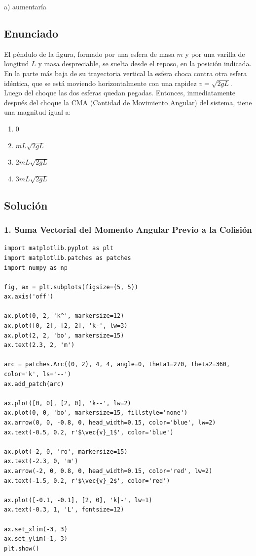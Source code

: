 \documentclass[12pt, a4paper]{article}
\begin{document}
\begin{tcolorbox}[colback=green!5!white, colframe=green!50!black, title=Respuesta Final]
\centering \Large a) aumentaría
\end{tcolorbox}

\vspace{1cm}

\subsection*{Enunciado}
El péndulo de la figura, formado por una esfera de masa $m$ y por una varilla de longitud $L$ y masa despreciable, se suelta desde el reposo, en la posición indicada. En la parte más baja de su trayectoria vertical la esfera choca contra otra esfera idéntica, que se está moviendo horizontalmente con una rapidez $v = \sqrt{2gL}$. Luego del choque las dos esferas quedan pegadas. Entonces, inmediatamente después del choque la CMA (Cantidad de Movimiento Angular) del sistema, tiene una magnitud igual a:
\begin{enumerate}[label=\alph*)]
    \item $0$
    \item $mL\sqrt{2gL}$
    \item $2mL\sqrt{2gL}$
    \item $3mL\sqrt{2gL}$
\end{enumerate}

\subsection*{Solución}

\subsubsection*{1. Suma Vectorial del Momento Angular Previo a la Colisión}

\begin{verbatim}
import matplotlib.pyplot as plt
import matplotlib.patches as patches
import numpy as np

fig, ax = plt.subplots(figsize=(5, 5))
ax.axis('off')

ax.plot(0, 2, 'k^', markersize=12)
ax.plot([0, 2], [2, 2], 'k-', lw=3)
ax.plot(2, 2, 'bo', markersize=15)
ax.text(2.3, 2, 'm')

arc = patches.Arc((0, 2), 4, 4, angle=0, theta1=270, theta2=360, color='k', ls='--')
ax.add_patch(arc)

ax.plot([0, 0], [2, 0], 'k--', lw=2)
ax.plot(0, 0, 'bo', markersize=15, fillstyle='none')
ax.arrow(0, 0, -0.8, 0, head_width=0.15, color='blue', lw=2)
ax.text(-0.5, 0.2, r'$\vec{v}_1$', color='blue')

ax.plot(-2, 0, 'ro', markersize=15)
ax.text(-2.3, 0, 'm')
ax.arrow(-2, 0, 0.8, 0, head_width=0.15, color='red', lw=2)
ax.text(-1.5, 0.2, r'$\vec{v}_2$', color='red')

ax.plot([-0.1, -0.1], [2, 0], 'k|-', lw=1)
ax.text(-0.3, 1, 'L', fontsize=12)

ax.set_xlim(-3, 3)
ax.set_ylim(-1, 3)
plt.show()
\end{verbatim}
\end{document}
